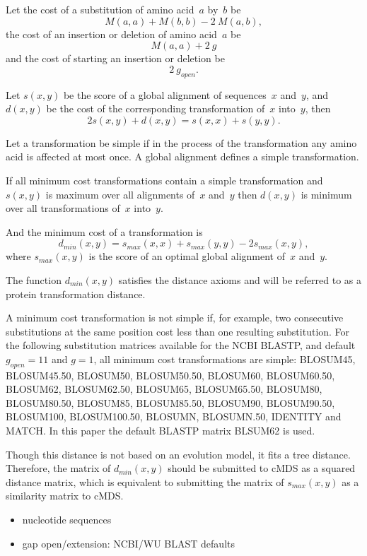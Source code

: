 \documentclass[10pt,a4paper]{article}
\begin{document}
Let the cost of a substitution of amino acid~$a$ by~$b$ be 
$$ M(a,a) + M(b,b) - 2 \ M(a,b), $$
the cost of an insertion or deletion of amino acid~$a$ be 
$$ M(a,a) + 2 \ g $$
and the cost of starting an insertion or deletion be 
$$ 2 \ g_{open}. $$

Let $s(x,y)$ be the score of a global alignment of sequences~$x$ and~$y$, and $d(x,y)$ be the cost of the corresponding transformation of~$x$ into~$y$, 
then 
$$ 2 s(x,y) + d(x,y) = s(x,x) + s(y,y). $$

Let a transformation be simple if in the process of the transformation any amino acid is affected at most once. 
A global alignment defines a simple transformation.

If all minimum cost transformations contain a simple transformation and $s(x,y)$ is maximum over all alignments of~$x$ and~$y$ 
then $d(x,y)$ is minimum over all transformations of~$x$ into~$y$.

And the minimum cost of a transformation is 
$$ d_{min}(x,y) = s_{max}(x,x) + s_{max}(y,y) - 2 s_{max}(x,y), $$
where $s_{max}(x,y)$ is the score of an optimal global alignment of~$x$ and~$y$.

The function $d_{min}(x,y)$ satisfies the distance axioms and will be referred to as a protein transformation distance.

A minimum cost transformation is not simple if, for example, two consecutive substitutions at the same position cost less than one resulting substitution. 
For the following substitution matrices available for the NCBI BLASTP, and default $g_{open} = 11$ and $g = 1$, 
all minimum cost transformations are simple: 
BLOSUM45, BLOSUM45.50, BLOSUM50, BLOSUM50.50, BLOSUM60, BLOSUM60.50, BLOSUM62, BLOSUM62.50, BLOSUM65, BLOSUM65.50, BLOSUM80, BLOSUM80.50, BLOSUM85, BLOSUM85.50, 
BLOSUM90, BLOSUM90.50, BLOSUM100, BLOSUM100.50, BLOSUMN, BLOSUMN.50, IDENTITY and MATCH. 
In this paper the default BLASTP matrix BLSUM62 is used.

Though this distance is not based on an evolution model, it fits a tree distance. 
Therefore, the matrix of $d_{min}(x,y)$ should be submitted to cMDS as a squared distance matrix, 
which is equivalent to submitting the matrix of $s_{max}(x,y)$ as a similarity matrix to cMDS.

\comm 
{
\begin{itemize}
  \item nucleotide sequences
  \item gap open/extension: NCBI/WU BLAST defaults
\end{itemize}    
}
\end{document}
